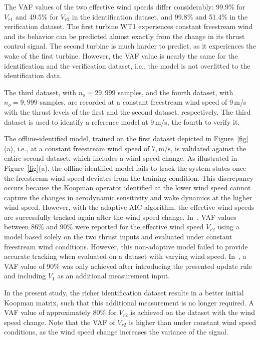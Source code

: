 The VAF values of the two effective wind speeds differ considerably: 99.9\% for $V_{r1}$ and 49.5\% for $V_{r2}$ in the identification dataset, and 99.8\% and 51.4\% in the verification dataset. The first turbine WT1 experiences constant freestream wind and its behavior can be predicted almost exactly from the change in its thrust control signal. The second turbine is much harder to predict, as it experiences the wake of the first turbine. However, the VAF value is nearly the same for the identification and the verification dataset, i.e., the model is not overfitted to the identification data.

The third dataset, with $n_o = 29,999$ samples, and the fourth dataset, with $n_o = 9,999$ samples, are recorded at a constant freestream wind speed of 9\,m/s with the thrust levels of the first and the second dataset, respectively. The third dataset is used to identify a reference model at 9\,m/s, the fourth to verify it.


The offline-identified model, trained on the first dataset depicted in Figure~\ref{fig}(a), i.e., at a constant freestream wind speed of $7,\mathrm{m/s}$, is validated against the entire second dataset, which includes a wind speed change. As illustrated in Figure~\ref{fig}(a), the offline-identified model fails to track the system states once the freestream wind speed deviates from the training condition. This discrepancy occurs because the Koopman operator identified at the lower wind speed cannot capture the changes in aerodynamic sensitivity and wake dynamics at the higher wind speed. However, with the adaptive AIC algorithm, the effective wind speeds are successfully tracked again after the wind speed change. In~\cite{sharan2022Koopman}, VAF values between 86\% and 90\% were reported for the effective wind speed $V_{r2}$ using a model based solely on the two thrust inputs and evaluated under constant freestream wind conditions. However, this non-adaptive model failed to provide accurate tracking when evaluated on a dataset with varying wind speed. In~\cite{dittmer2022data}, a VAF value of 90\% was only achieved after introducing the presented update rule and including $V_1$ as an additional measurement input.

In the present study, the richer identification dataset results in a better initial Koopman matrix, such that this additional measurement is no longer required. A VAF value of approximately 80\% for $V_{r2}$ is achieved on the dataset with the wind speed change. Note that the VAF of $V_{r2}$ is higher than under constant wind speed conditions, as the wind speed change increases the variance of the signal.


